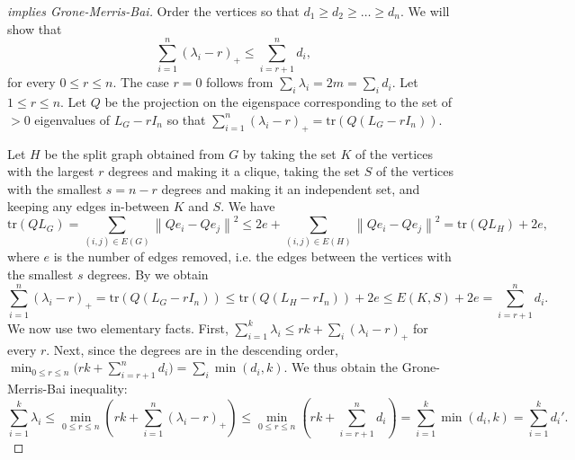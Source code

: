 \documentclass[10pt,reqno]{amsart}
\theoremstyle{definition}
\theoremstyle{remark}
\numberwithin{equation}{section}
\newcommand{\tr}{\text{tr} }
\newcommand{\norm}[1]{\left\| #1 \right\|}
\begin{document}
\begin{proof}[ implies Grone-Merris-Bai]
     Order the vertices so that $d_1\ge d_2\ge \ldots \ge d_n$. We will show that
     $$\sum\limits_{i=1}^{n}(\lambda_i-r)_+\le \sum\limits_{i=r+1}^{n}d_i,$$
     for every $0\le r\le n$. The case $r=0$ follows from $\sum_i\lambda_i=2m=\sum_i d_i$. Let $1\le r\le n$.
     Let $Q$ be the projection on the eigenspace corresponding to the set of $>0$ eigenvalues of $L_G-rI_n$ so that
     $\sum\limits_{i=1}^{n}(\lambda_i-r)_+=\tr(Q(L_G-rI_n))$. 
     
     Let $H$ be the split graph obtained from $G$ by taking the set $K$ of the vertices with the largest $r$ degrees and making it a clique, taking the set $S$ of the vertices with the smallest $s=n-r$ degrees and making it an independent set, and keeping any edges in-between $K$ and $S$. We have
     $$\tr (QL_G)=\sum\limits_{(i,j)\in E(G)}\norm{Qe_i-Qe_j}^2\le 2e+\sum\limits_{(i,j)\in E(H)}\norm{Qe_i-Qe_j}^2=\tr(QL_H)+2e,$$
     where $e$ is the number of edges removed, i.e. the edges between the vertices with the smallest $s$ degrees. By  we obtain
     $$\sum\limits_{i=1}^{n}(\lambda_i-r)_+=\tr(Q(L_G-rI_n))\le \tr(Q(L_H-rI_n))+2e\le E(K,S)+2e=\sum\limits_{i=r+1}^n d_i.$$
     We now use two elementary facts. First, $\sum_{i=1}^k\lambda_i\le rk+\sum_i(\lambda_i-r)_+$ for every $r$. Next, since the degrees are in the descending order, $\min_{0\le r\le n}\bigl(rk+\sum_{i=r+1}^n d_i\bigr)=\sum_i\min(d_i,k)$. We thus obtain the Grone-Merris-Bai inequality:
     $$\sum\limits_{i=1}^{k}\lambda_i\le \min_{0\le r\le n}\left (rk+\sum\limits_{i=1}^{n}(\lambda_i-r)_+\right )\le \min_{0\le r\le n}\left (rk+\sum\limits_{i=r+1}^{n}d_i\right )=\sum\limits_{i=1}^{k}\min(d_i,k)=\sum\limits_{i=1}^{k}d_i'.$$
\end{proof}
\end{document}
